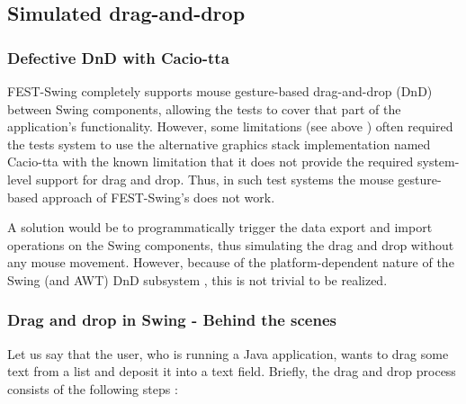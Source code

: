 \subsection{Simulated drag-and-drop}\label{sec:simulated-dnd}

\subsubsection{Defective DnD with Cacio-tta}\label{sec:defective-dnd}

FEST-Swing completely supports mouse gesture-based drag-and-drop (DnD) between Swing components, allowing the tests to cover that part of the application's functionality. However, some limitations (see above ) often required the tests system to use the alternative graphics stack implementation named Cacio-tta \cite{Cacio_Tta_FEST} with the known limitation that it does not provide the required system-level support for drag and drop. Thus, in such test systems the mouse gesture-based approach of FEST-Swing's does not work.

A solution would be to programmatically trigger the data export and import operations on the Swing components, thus simulating the drag and drop without any mouse movement. However, because of the platform-dependent nature of the Swing (and AWT) DnD subsystem \cite{IntroDnD} \cite{DnDSubsystem}, this is not trivial to be realized.

\subsubsection{Drag and drop in Swing - Behind the scenes}\label{sec:dnd-swing}

Let us say that the user, who is running a Java application, wants to drag some text from a list and deposit it into a text field. Briefly, the drag and drop process consists of the following steps \cite{IntroDnD}:

